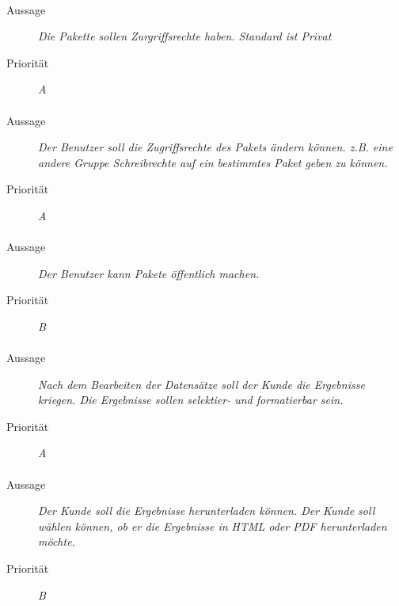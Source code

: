 \paragraph{}
\begin{description}
\item[Aussage] \textit{Die Pakette sollen Zurgriffsrechte haben. Standard ist Privat}
\item[Priorität] \textit{A}
\end{description}

\paragraph{}
\begin{description}
\item[Aussage] \textit{Der Benutzer soll die Zugriffsrechte des Pakets ändern können. z.B. eine andere Gruppe Schreibrechte auf ein bestimmtes Paket geben zu können.}
\item[Priorität] \textit{A}
\end{description}

\paragraph{}
\begin{description}
\item[Aussage] \textit{Der Benutzer kann Pakete öffentlich machen.}
\item[Priorität] \textit{B}
\end{description}

\paragraph{}
\begin{description}
\item[Aussage] \textit{Nach dem Bearbeiten der Datensätze soll der Kunde die Ergebnisse kriegen. Die Ergebnisse sollen selektier- und formatierbar sein.}
\item[Priorität] \textit{A}
\end{description}

\paragraph{}
\begin{description}
\item[Aussage] \textit{Der Kunde soll die Ergebnisse herunterladen können. Der Kunde soll wählen können, ob er die Ergebnisse in HTML oder PDF herunterladen möchte.}
\item[Priorität] \textit{B}
\end{description}